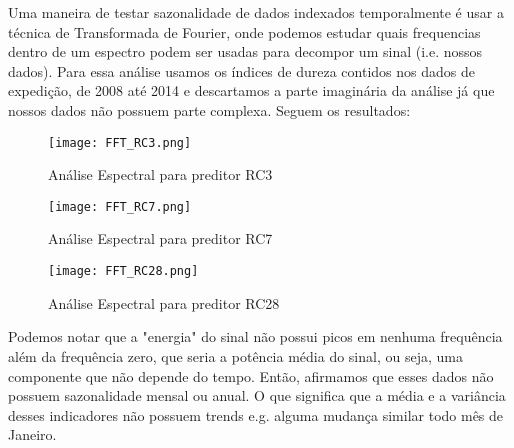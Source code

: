 Uma maneira de testar sazonalidade de dados indexados temporalmente é usar a técnica de Transformada de Fourier, onde podemos estudar quais frequencias dentro de um espectro podem ser usadas para decompor um sinal (i.e. nossos dados). Para essa análise usamos os índices de dureza contidos nos dados de expedição, de 2008 até 2014 e descartamos a parte imaginária da análise já que nossos dados não possuem parte complexa. Seguem os resultados:


\begin{figure}[H]
\centering
\texttt{[image: FFT\_RC3.png]}
\caption{Análise Espectral para preditor RC3}
\end{figure}

\begin{figure}[H]
\centering
\texttt{[image: FFT\_RC7.png]}
\caption{Análise Espectral para preditor RC7}
\end{figure}

\begin{figure}[H]
\centering
\texttt{[image: FFT\_RC28.png]}
\caption{Análise Espectral para preditor RC28}
\end{figure}


Podemos notar que a "energia" do sinal não possui picos em nenhuma frequência além da frequência zero, que seria a potência média do sinal, ou seja, uma componente que não depende do tempo. Então, afirmamos que esses dados não possuem sazonalidade mensal ou anual. O que significa que a média e a variância desses indicadores não possuem trends e.g. alguma mudança similar todo mês de Janeiro.


